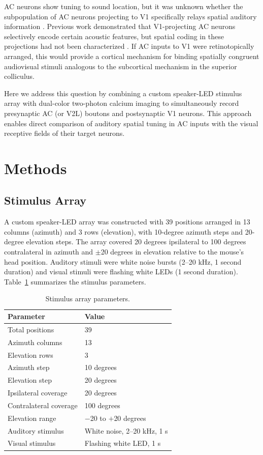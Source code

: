 \documentclass[11pt]{article}
\begin{document}
AC neurons show tuning to sound location, but it was unknown whether the subpopulation of AC neurons projecting to V1 specifically relays spatial auditory information \citep{stecker2005sound}. Previous work demonstrated that V1-projecting AC neurons selectively encode certain acoustic features, but spatial coding in these projections had not been characterized \citep{ibrahim2016cross}. If AC inputs to V1 were retinotopically arranged, this would provide a cortical mechanism for binding spatially congruent audiovisual stimuli analogous to the subcortical mechanism in the superior colliculus.

Here we address this question by combining a custom speaker-LED stimulus array with dual-color two-photon calcium imaging to simultaneously record presynaptic AC (or V2L) boutons and postsynaptic V1 neurons. This approach enables direct comparison of auditory spatial tuning in AC inputs with the visual receptive fields of their target neurons.

\section{Methods}

\subsection{Stimulus Array}

A custom speaker-LED array was constructed with 39 positions arranged in 13 columns (azimuth) and 3 rows (elevation), with 10-degree azimuth steps and 20-degree elevation steps. The array covered 20 degrees ipsilateral to 100 degrees contralateral in azimuth and $\pm$20 degrees in elevation relative to the mouse's head position. Auditory stimuli were white noise bursts (2--20 kHz, 1 second duration) and visual stimuli were flashing white LEDs (1 second duration). Table~\ref{tab:array} summarizes the stimulus parameters.

\begin{table}[htbp]
\centering
\caption{Stimulus array parameters.}
\label{tab:array}
\begin{tabular}{ll}
\toprule
Parameter & Value \\
\midrule
Total positions & 39 \\
Azimuth columns & 13 \\
Elevation rows & 3 \\
Azimuth step & 10 degrees \\
Elevation step & 20 degrees \\
Ipsilateral coverage & 20 degrees \\
Contralateral coverage & 100 degrees \\
Elevation range & $-$20 to $+$20 degrees \\
Auditory stimulus & White noise, 2--20 kHz, 1 s \\
Visual stimulus & Flashing white LED, 1 s \\
\bottomrule
\end{tabular}
\end{table}
\end{document}

